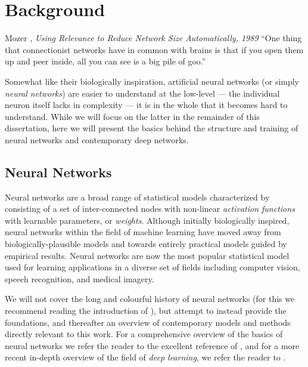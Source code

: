 \documentclass[thesis]{subfiles}
\begin{document}
\chapter{Background}
\label{background}
\begin{chapquote}{Mozer \etal, \textit{Using Relevance to Reduce Network Size Automatically, 1989}}
    ``One thing that connectionist networks have in common with brains is that if you open them up and peer inside, all you can see is a big pile of goo.''
\end{chapquote}
Somewhat like their biologically inspiration, artificial neural networks (or simply \emph{neural networks}) are easier to understand at the low-level --- the individual neuron itself lacks in complexity --- it is in the whole that it becomes hard to understand. While we will focus on the latter in the remainder of this dissertation, here we will present the basics behind the structure and training of neural networks and contemporary deep networks.

\section{Neural Networks}
Neural networks are a broad range of statistical models characterized by consisting of a set of inter-connected nodes with non-linear \emph{activation functions} with learnable parameters, or \emph{weights}.
 Although initially biologically inspired, neural networks within the field of machine learning have moved away from biologically-plausible models and towards entirely practical models guided by empirical results. Neural networks are now the most popular statistical model used for learning applications in a diverse set of fields including computer vision, speech recognition, and medical imagery. 

We will not cover the long and colourful history of neural networks (for this we recommend reading the introduction of \citet{goodfellow2016deep}), but attempt to instead provide the foundations, and thereafter an overview of contemporary models and methods directly relevant to this work. For a comprehensive overview of the basics of neural networks we refer the reader to the excellent reference of \citet{Bishop1995}, and for a more recent  in-depth overview of the field of \emph{deep learning}, we refer the reader to \citet{goodfellow2016deep}. 
\end{document}
